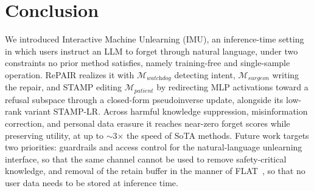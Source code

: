 
\section{Conclusion}
We introduced Interactive Machine Unlearning (IMU), an inference-time setting in which users instruct an LLM to forget through natural language, under two constraints no prior method satisfies, namely training-free and single-sample operation. RePAIR realizes it with $\mathcal{M}_{\textit{watchdog}}$ detecting intent, $\mathcal{M}_{\textit{surgeon}}$ writing the repair, and STAMP editing $\mathcal{M}_{\textit{patient}}$ by redirecting MLP activations toward a refusal subspace through a closed-form pseudoinverse update, alongside its low-rank variant STAMP-LR. Across harmful knowledge suppression, misinformation correction, and personal data erasure it reaches near-zero forget scores while preserving utility, at up to $\sim$3$\times$ the speed of SoTA methods. Future work targets two priorities: guardrails and access control for the natural-language unlearning interface, so that the same channel cannot be used to remove safety-critical knowledge, and removal of the retain buffer in the manner of FLAT~\cite{wang2024llm}, so that no user data needs to be stored at inference time.
